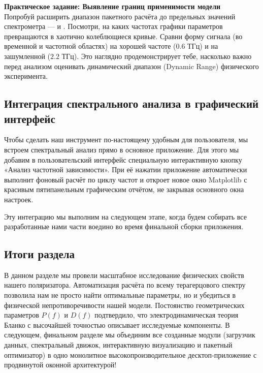 \begin{minitaskbox}
\textbf{Практическое задание: Выявление границ применимости модели}
\\
Попробуй расширить диапазон пакетного расчёта до предельных значений спектрометра —  и . Посмотри, на каких частотах графики параметров превращаются в хаотично колеблющиеся кривые. Сравни форму сигнала (во временной и частотной областях) на хорошей частоте ($0.6$ ТГц) и на зашумленной ($2.2$ ТГц). Это наглядно продемонстрирует тебе, насколько важно перед анализом оценивать динамический диапазон (Dynamic Range) физического эксперимента.
\end{minitaskbox}

\subsection{Интеграция спектрального анализа в графический интерфейс}

Чтобы сделать наш инструмент по-настоящему удобным для пользователя, мы встроем спектральный анализ прямо в основное приложение. Для этого мы добавим в пользовательский интерфейс специальную интерактивную кнопку «Анализ частотной зависимости». При её нажатии приложение автоматически выполнит фоновый расчёт по циклу частот и откроет новое окно Matplotlib с красивым пятипанельным графическим отчётом, не закрывая основного окна настроек.

Эту интеграцию мы выполним на следующем этапе, когда будем собирать все разработанные нами части воедино во время финальной сборки приложения.

\subsection{Итоги раздела}
В данном разделе мы провели масштабное исследование физических свойств нашего поляризатора. Автоматизация расчёта по всему терагерцового спектру позволила нам не просто найти оптимальные параметры, но и убедиться в физической непротиворечивости нашей модели. Постоянство геометрических параметров $P(f)$ и $D(f)$ подтвердило, что электродинамическая теория Бланко с высочайшей точностью описывает исследуемые компоненты. В следующем, финальном разделе мы объединим все созданные модули (загрузчик данных, спектральный движок, интерактивную визуализацию и пакетный оптимизатор) в одно монолитное высокопроизводительное десктоп-приложение с продвинутой оконной архитектурой!

